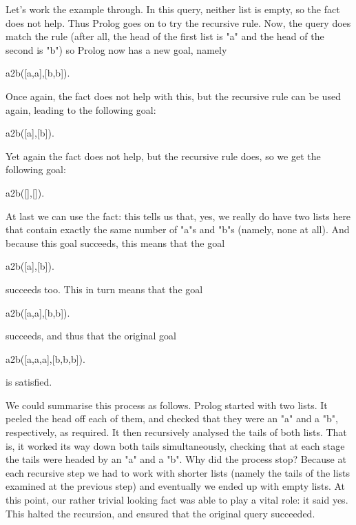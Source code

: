 Let's work the example through. In this query, neither list is empty,
so the fact does not help. Thus Prolog goes on to try the recursive
rule. Now, the query does match the rule (after all, the head of the
first list is "a" and the head of the second is "b") so
Prolog now has a new goal, namely
\begin{LPNcodedisplay}
a2b([a,a],[b,b]).
\end{LPNcodedisplay}
Once again, the fact does not help with this, but the recursive rule
can be used again, leading to the following goal:
\begin{LPNcodedisplay}
a2b([a],[b]).
\end{LPNcodedisplay}
Yet again the fact does not help, but the recursive rule does, so we
get the following goal:
\begin{LPNcodedisplay}
a2b([],[]).
\end{LPNcodedisplay}
At last we can use the fact: this tells us that, yes, we really do
have two lists here that contain exactly the same number of "a"s
and "b"s (namely, none at all). And because this goal succeeds,
this means that the goal
\begin{LPNcodedisplay}
a2b([a],[b]).
\end{LPNcodedisplay}
succeeds too. This in turn means that the goal
\begin{LPNcodedisplay}
a2b([a,a],[b,b]).
\end{LPNcodedisplay}
succeeds, and thus that the original goal
\begin{LPNcodedisplay}
a2b([a,a,a],[b,b,b]).
\end{LPNcodedisplay}
is satisfied.

We could summarise this process as follows.  Prolog started with two
lists. It peeled the head off each of them, and checked that they were
an "a" and a "b", respectively, as required. It then recursively
analysed the tails of both lists. That is, it worked its way down both
tails simultaneously, checking that at each stage the tails were
headed by an "a" and a "b".  Why did the process stop?  Because at
each recursive step we had to work with shorter lists (namely the
tails of the lists examined at the previous step) and eventually we
ended up with empty lists.  At this point, our rather trivial looking
fact was able to play a vital role: it said yes. This halted the
recursion, and ensured that the original query succeeded.

